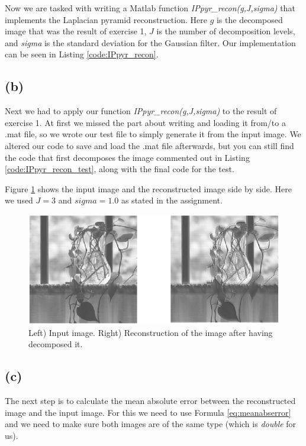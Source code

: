 \documentclass{article}
\begin{document}
Now we are tasked with writing a Matlab function \textit{IPpyr\_recon(g,J,sigma)} that implements the Laplacian pyramid reconstruction. Here $g$ is the decomposed image that was the result of exercise 1, $J$ is the number of decomposition levels, and \textit{sigma} is the standard deviation for the Gaussian filter. Our implementation can be seen in  Listing \ref{code:IPpyr_recon}.

\subsection*{(b)}
Next we had to apply our function \textit{IPpyr\_recon(g,J,sigma)} to the result of exercise 1. At first we missed the part about writing and loading it from/to a .mat file, so we wrote our test file to simply generate it from the input image. We altered our code to save and load the .mat file afterwards, but you can still find the code that first decomposes the image commented out in  Listing \ref{code:IPpyr_recon_test}, along with the final code for the test.

Figure \ref{fig:2b} shows the input image and the reconstructed image side by side. Here we used $J = 3$ and $sigma = 1.0$ as stated in the assignment.

\begin{figure}[h]
    \centering
    \includegraphics[width=\textwidth]{Assignment_3/output_plots/IPpyr_recon_test_partial.png}
    \caption{Left) Input image. Right) Reconstruction of the image after having decomposed it.}
    \label{fig:2b}
\end{figure}

\subsection*{(c)}
The next step is to calculate the mean absolute error between the reconstructed image and the input image. For this we need to use Formula \ref{eq:meanabserror} and we need to make sure both images are of the same type (which is \textit{double} for us).
\end{document}
